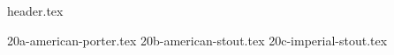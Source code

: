 \clearpage
{}
\divisorLine

{header.tex}

\begin{multicols}{2}

{20a-american-porter.tex}
{20b-american-stout.tex}
{20c-imperial-stout.tex}

\end{multicols}